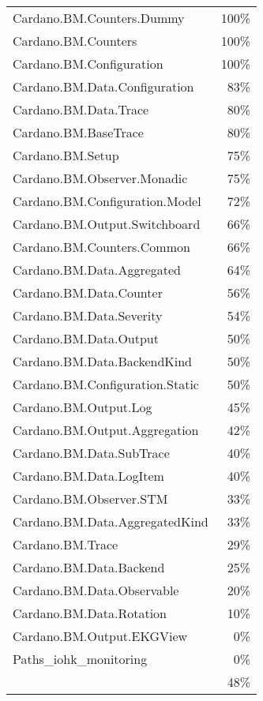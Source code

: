 \begin{tabular}{l r}
   Cardano.BM.Counters.Dummy & 100\% \\
   Cardano.BM.Counters & 100\% \\
   Cardano.BM.Configuration & 100\% \\
   Cardano.BM.Data.Configuration & 83\% \\
   Cardano.BM.Data.Trace & 80\% \\
   Cardano.BM.BaseTrace & 80\% \\
   Cardano.BM.Setup & 75\% \\
   Cardano.BM.Observer.Monadic & 75\% \\
   Cardano.BM.Configuration.Model & 72\% \\
   Cardano.BM.Output.Switchboard & 66\% \\
   Cardano.BM.Counters.Common & 66\% \\
   Cardano.BM.Data.Aggregated & 64\% \\
   Cardano.BM.Data.Counter & 56\% \\
   Cardano.BM.Data.Severity & 54\% \\
   Cardano.BM.Data.Output & 50\% \\
   Cardano.BM.Data.BackendKind & 50\% \\
   Cardano.BM.Configuration.Static & 50\% \\
   Cardano.BM.Output.Log & 45\% \\
   Cardano.BM.Output.Aggregation & 42\% \\
   Cardano.BM.Data.SubTrace & 40\% \\
   Cardano.BM.Data.LogItem & 40\% \\
   Cardano.BM.Observer.STM & 33\% \\
   Cardano.BM.Data.AggregatedKind & 33\% \\
   Cardano.BM.Trace & 29\% \\
   Cardano.BM.Data.Backend & 25\% \\
   Cardano.BM.Data.Observable & 20\% \\
   Cardano.BM.Data.Rotation & 10\% \\
   Cardano.BM.Output.EKGView & 0\% \\
   Paths\_iohk\_monitoring & 0\% \\
    & 48\% \\
\end{tabular}
